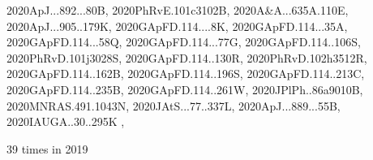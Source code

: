 \documentclass[12pt]{article}
\begin{document}
\begin{description}
{2020ApJ...892...80B,%
2020PhRvE.101c3102B,%
2020A&A...635A.110E,%
2020ApJ...905..179K,%
2020GApFD.114....8K,%
2020GApFD.114...35A,%
2020GApFD.114...58Q,%
2020GApFD.114...77G,%
2020GApFD.114..106S,%
2020PhRvD.101j3028S,%
2020GApFD.114..130R,%
2020PhRvD.102h3512R,%
2020GApFD.114..162B,%
2020GApFD.114..196S,%
2020GApFD.114..213C,%
2020GApFD.114..235B,%
2020GApFD.114..261W,%
2020JPlPh..86a9010B,%
2020MNRAS.491.1043N,%
2020JAtS...77..337L,%
2020ApJ...889...55B,%
2020IAUGA..30..295K%
},\item
\item %
39 times in 2019 \citep{
2019arXiv190808781E,%
}
\end{description}
\end{document}
